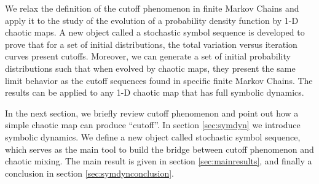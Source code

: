 %
%

We relax the definition of the cutoff phenomenon in finite Markov Chains and apply it to the study of the evolution of a probability density function by 1-D chaotic maps. A new object called a stochastic symbol sequence is developed to prove that for a set of initial distributions, the total variation versus iteration curves present cutoffs. Moreover, we can generate a set of initial probability
distributions such that when evolved by chaotic maps, they present the same limit behavior as the cutoff sequences found in specific finite Markov Chains. The results can be applied to any 1-D chaotic map that has full symbolic dynamics.




In the next section, we briefly review cutoff phenomenon and point out how a simple chaotic map can produce ``cutoff''. In section \ref{sec:symdyn} we
introduce symbolic dynamics. We define a new object called stochastic symbol sequence, which serves as the main tool to build the bridge
between cutoff phenomenon and chaotic mixing. The main result is given in section \ref{sec:mainresults}, and finally a conclusion in section \ref{sec:symdynconclusion}.


